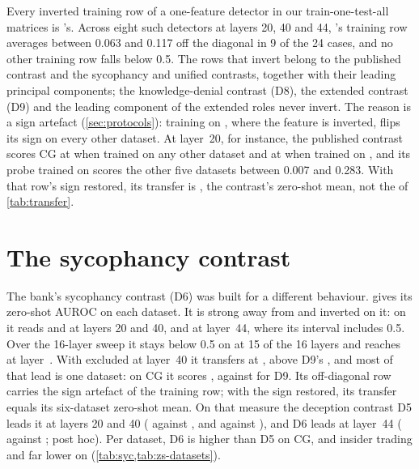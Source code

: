 Every inverted training row of a one-feature detector in our train-one-test-all matrices is \hpkr's.
Across eight such detectors at layers 20, 40 and 44, \hpkr's training row averages between 0.063 and
0.117 off the diagonal in 9 of the 24 cases, and no other training row falls below 0.5. The rows that
invert belong to the published contrast and the sycophancy and unified contrasts, together with their
leading principal components; the knowledge-denial contrast (D8), the extended contrast (D9) and the
leading component of the extended roles never invert. The reason is a sign artefact
(\cref{sec:protocols}): training on \hpkr, where the feature is inverted, flips its sign on every other
dataset. At layer~20, for instance, the published contrast scores CG at  when trained
on any other dataset and at  when trained on \hpkr, and its probe trained on \hpkr{}
scores the other five datasets between 0.007 and 0.283. With that row's sign restored, its transfer is
, the contrast's zero-shot mean, not the  of \cref{tab:transfer}.

\section*{The sycophancy contrast}

The bank's sycophancy contrast (D6) was built for a different behaviour.  gives its
zero-shot AUROC on each dataset. It is strong away from \hpkr{} and inverted on it: on \hpkr{} it reads
 and  at layers 20 and 40, and  at layer~44,
where its interval includes 0.5. Over the 16-layer sweep it stays below 0.5 on \hpkr{} at 15 of the 16
layers and reaches  at layer~. With \hpkr{} excluded
at layer~40 it transfers at , above D9's , and most of that lead is one
dataset: on CG it scores , against  for D9. Its off-diagonal row
carries the sign artefact of the \hpkr{} training row; with the sign restored, its transfer equals its
six-dataset zero-shot mean. On that measure the deception contrast D5 leads it at layers 20 and 40
( against , and  against
), and D6 leads at layer~44 ( against ; post
hoc). Per dataset, D6 is higher than D5 on CG, \hpc{} and insider trading and far lower on \hpkr{}
(\cref{tab:syc,tab:zs-datasets}).

